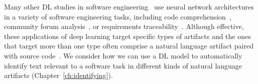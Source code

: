 Many other \acs{DL} studies in software engineering~\cite{ferreira2021,li2018deep, watson2022}
use neural network architectures 
in a variety of software engineering tasks, including
code comprehension~\cite{allamanis2015, mi2018}, 
community forum analysis~\cite{Lin2018, wang2019}, 
or requirements traceability~\cite{chen2019, guo2017}.
Although effective, these applications of deep learning
target specific
types of artifacts and the ones 
that target more than one type 
often comprise a natural language artifact 
paired with source code~\cite{watson2022}. 
We consider how we can use a \acs{DL}
model to automatically 
identify text relevant to a software task
in different kinds of natural language artifacts (Chapter~\ref{ch:identifying}).


